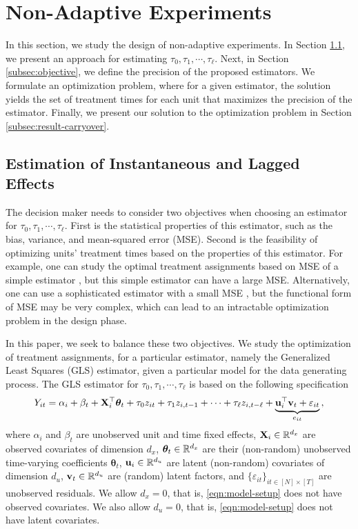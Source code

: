 \section{Non-Adaptive Experiments}\label{sec:model}
In this section, we study the  design of non-adaptive experiments. In Section \ref{subsec:estimator}, we present an approach for estimating $\tau_0, \tau_1, \cdots, \tau_\ell$.  Next, in Section \ref{subsec:objective}, we define the precision of the proposed estimators. We formulate an optimization problem, where for a given estimator, the solution yields the set of treatment times for each unit that maximizes the precision of the estimator. Finally, we present our solution to the optimization problem in Section \ref{subsec:result-carryover}.

 \subsection{Estimation of Instantaneous and Lagged Effects}\label{subsec:estimator}
    The decision maker needs to consider two objectives when choosing an estimator for $\tau_0, \tau_1, \cdots, \tau_\ell$. First is the statistical properties of this estimator, such as the bias, variance, and mean-squared error (MSE). Second is the feasibility of optimizing units' treatment times based on the properties of this estimator. For example, one can study the optimal treatment assignments based on MSE of a simple estimator , but this simple estimator can have a large  MSE. Alternatively, one can use a sophisticated estimator with a small MSE , but the functional form of MSE may be very complex, which can lead to an intractable optimization problem in the design phase.

    In this paper, we seek to balance these two objectives. We study the optimization of treatment assignments, for a particular estimator, namely the Generalized Least Squares (GLS) estimator, given a particular model for the data generating process. The GLS estimator for $\tau_0, \tau_1, \cdots, \tau_\ell$ is based on  the following specification
    \begin{equation}\label{eqn:model-setup} 
    Y_{it} = \alpha_i +  \beta_t + \mathbf{X}_i^\top  \bm{\theta}_t + \tau_0 z_{it} + \tau_1 z_{i,t-1} + \cdots + \tau_{\ell} z_{i,t-\ell}  + \underbrace{\mathbf{u}_i^\top \mathbf{v}_t + \varepsilon_{it}}_{e_{it}}\, ,
    \end{equation}
	where $\alpha_i$ and $\beta_t$ are unobserved unit and time fixed effects, $\mathbf{X}_i  \in \mathbb{R}^{d_x}$ are observed covariates of dimension $d_x$, $\bm{\theta}_t \in\mathbb{R}^{d_x}$ are their (non-random) unobserved time-varying coefficients $\bm{\theta}_t$, $\mathbf{u}_i \in \mathbb{R}^{d_u}$ are latent (non-random) covariates of dimension $d_u$, $\mathbf{v}_t \in \mathbb{R}^{d_u}$ are (random) latent factors, and $\{\varepsilon_{it}\}_{it\in[N]\times[T]}$ are unobserved residuals. We allow $d_x = 0$, that is, \eqref{eqn:model-setup} does not have observed covariates. We also allow $d_u = 0$, that is, \eqref{eqn:model-setup} does not have latent covariates.
	

